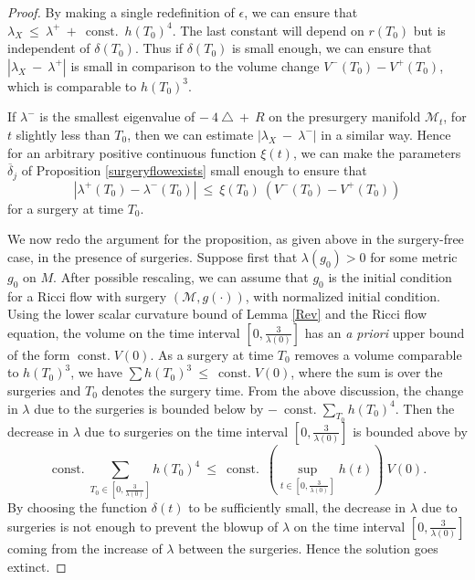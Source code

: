 \documentclass[12pt]{amsart}
\newcommand{\const}{\operatorname{const.}}
\newcommand{\M}{{\mathcal M}}
\numberwithin{equation}{section}
\theoremstyle{plain}
\theoremstyle{definition}
\theoremstyle{remark}
\begin{document}
\begin{proof}
By making a single redefinition of $\epsilon$,
we can ensure that
$\lambda_X \: \le \: \lambda^+ \: + \: \const \: h(T_0)^{4}$. The last
constant will depend on $r(T_0)$ but is independent of $\delta(T_0)$.
Thus if $\delta(T_0)$ is small enough, we can ensure that
$|\lambda_X \: - \: \lambda^+|$ is small in comparison to the
volume change $V^-(T_0) - V^+(T_0)$, which is comparable to $h(T_0)^3$.


If $\lambda^-$ is the smallest eigenvalue of $- \:4 \: \triangle \: + \: R$ 
on the presurgery manifold $\M_t$, for $t$ slightly less than $T_0$,
then we can estimate $|\lambda_X \: - \: \lambda^-|$ in a similar way.
Hence for an arbitrary positive continuous function $\xi(t)$, 
we can make the parameters $\overline{\delta}_j$ of
Proposition \ref{surgeryflowexists} small enough to ensure that
\begin{equation}
|\lambda^+(T_0) - \lambda^-(T_0)| \: \le \: \xi(T_0) \: 
(V^-(T_0) - V^+(T_0))
\end{equation}
for a surgery at time $T_0$.

We now redo the argument for the proposition, as given above in the
surgery-free case, in the presence of surgeries.
Suppose first that $\lambda(g_0) > 0$ for some metric $g_0$ on $M$. 
After possible rescaling, we can assume that $g_0$ is the initial
condition for a Ricci flow with surgery $(\M, g(\cdot))$, with normalized initial condition.
Using the lower scalar curvature bound of Lemma \ref{Rev} and the Ricci
flow equation,
the volume on the time interval $[0, \frac{3}{\lambda(0)}]$ has an {\it a priori} upper
bound of the form $\const V(0)$. As a surgery at time $T_0$ removes a 
volume comparable to $h(T_0)^3$, we have
$\sum h(T_0)^3 \: \le \: \const V(0)$, where the sum is over the
surgeries and $T_0$ denotes the
surgery time.  From the above discussion,
the change in $\lambda$ due to the 
surgeries is bounded below by $-\: \const \sum_{T_0} h(T_0)^4$.
Then the decrease in $\lambda$ due to surgeries on the time interval
$[0, \frac{3}{\lambda(0)}]$ is bounded above by
\begin{equation}
\const \sum_{T_0 \in [0, \frac{3}{\lambda(0)}]} h(T_0)^4 \: \le \:  \const \:
\left( \sup_{t \in [0, \frac{3}{\lambda(0)}]} h(t) \right) \: V(0).
\end{equation}
By choosing the function $\delta(t)$ to be sufficiently small,
the decrease in $\lambda$ due to surgeries
is not enough to prevent the blowup of $\lambda$ on the time
interval $[0, \frac{3}{\lambda(0)}]$ coming from the increase of
$\lambda$ between the surgeries. Hence the solution goes extinct.


\end{proof}
\end{document}
